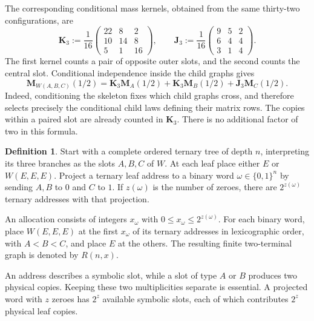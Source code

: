 \documentclass[scheme=plain,11pt]{ctexart}
\theoremstyle{definition}
\newtheorem{definition}[theorem]{Definition}
\theoremstyle{remark}
\begin{document}
The corresponding conditional mass kernels, obtained from the same thirty-two configurations, are
\begin{equation}\label{eq:wheatstone-kernels}
 \mathbf K_3:=\frac1{16}
 \begin{pmatrix}22&8&2\\10&14&8\\5&1&16\end{pmatrix},
 \qquad
 \mathbf J_3:=\frac1{16}
 \begin{pmatrix}9&5&2\\6&4&4\\3&1&4\end{pmatrix}.
\end{equation}
The first kernel counts a pair of opposite outer slots, and the second counts the central slot. Conditional independence inside the child graphs gives
\begin{equation}\label{eq:wheatstone-mass}
 \mathbf M_{W(A,B,C)}(1/2)
 =\mathbf K_3\mathbf M_A(1/2)
  +\mathbf K_3\mathbf M_B(1/2)
  +\mathbf J_3\mathbf M_C(1/2).
\end{equation}
Indeed, conditioning the skeleton fixes which child graphs cross, and therefore selects precisely the conditional child laws defining their matrix rows. The copies within a paired slot are already counted in $\mathbf K_3$. There is no additional factor of two in this formula.

\begin{definition}\label{def:leaf-allocation}
Start with a complete ordered ternary tree of depth $n$, interpreting its three branches as the slots $A,B,C$ of $W$. At each leaf place either $E$ or $W(E,E,E)$. Project a ternary leaf address to a binary word $\omega\in\{0,1\}^n$ by sending $A,B$ to $0$ and $C$ to $1$. If $z(\omega)$ is the number of zeroes, there are $2^{z(\omega)}$ ternary addresses with that projection.

An allocation consists of integers $x_\omega$ with $0\le x_\omega\le2^{z(\omega)}$. For each binary word, place $W(E,E,E)$ at the first $x_\omega$ of its ternary addresses in lexicographic order, with $A<B<C$, and place $E$ at the others. The resulting finite two-terminal graph is denoted by $R(n,x)$.
\end{definition}

An address describes a symbolic slot, while a slot of type $A$ or $B$ produces two physical copies. Keeping these two multiplicities separate is essential. A projected word with $z$ zeroes has $2^z$ available symbolic slots, each of which contributes $2^z$ physical leaf copies.
\end{document}
